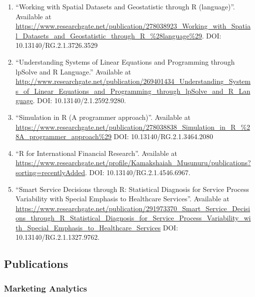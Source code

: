 \documentclass[10pt]{article}
\begin{document}
\begin{enumerate} 

\item \enquote{Working with Spatial Datasets and Geostatistic through R (language)}. Available at \url{https://www.researchgate.net/publication/278038923_Working_with_Spatial_Datasets_and_Geostatistic_through_R_\%28language\%29}. DOI: 10.13140/RG.2.1.3726.3529

\item \enquote{Understanding Systems of Linear Equations and Programming through lpSolve and R Language.} Available at \url{http://www.researchgate.net/publication/269401434_Understanding_Systems_of_Linear_Equations_and_Programming_through_lpSolve_and_R_Language}. DOI: 10.13140/2.1.2592.9280. 

\item  \enquote{Simulation in R (A programmer approach)}. Available at  \url{https://www.researchgate.net/publication/278038838_Simulation_in_R_\%28A_programmer_approach\%29} DOI: 10.13140/RG.2.1.3464.2080

\item \enquote{R for International Financial Research}. Available at  \url{https://www.researchgate.net/profile/Kamakshaiah_Musunuru/publications?sorting=recentlyAdded}. DOI: 10.13140/RG.2.1.4546.6967.  

\item \enquote{Smart Service Decisions through R: Statistical Diagnosis for Service Process Variability with Special Emphasis to Healthcare Services}. Available at  \url{https://www.researchgate.net/publication/291973370_Smart_Service_Decisions_through_R_Statistical_Diagnosis_for_Service_Process_Variability_with_Special_Emphasis_to_Healthcare_Services} DOI: 10.13140/RG.2.1.1327.9762.  


\end{enumerate} 

\subsection{Publications}

\subsubsection{Marketing Analytics}
\end{document}
